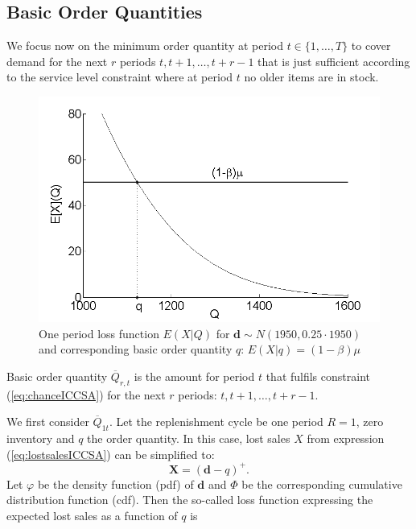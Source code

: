 \subsection{Basic Order Quantities}
\label{sec:safe}
We focus now on the minimum order quantity at period $t\in \{1,\ldots,T\}$  to cover demand for the next $r$ periods $t, t+1,\ldots, t+r-1$ that is just sufficient according to the service level constraint where at period $t$ no older items are in stock.
\begin{figure}[h]
\centering
\includegraphics[scale=0.4]{iccsa2015/figures/lossfunFig.png}
\caption{One period loss function $E(X|Q)$ for $\boldsymbol d \sim N(1950,0.25\cdot1950)$ and corresponding basic order quantity $q$: $E(X|q)=(1-\beta)\mu$}
\label{fig:lossfunFig}
\end{figure}
\begin{defn}
Basic order quantity $\overline Q_{r,t}$ is the amount for period $t$ that fulfils constraint (\ref{eq:chanceICCSA}) for the next $r$ periods: $t,t+1,\ldots,t+r-1$.
\end{defn}
We first consider $\overline Q_{1t}$. Let the replenishment cycle be one period $R=1$, zero inventory and $q$ the order quantity. In this case, lost sales $X$ from expression (\ref{eq:lostsalesICCSA}) can be simplified to:
%
\begin{equation}
\boldsymbol{X}=\left(\boldsymbol{d}-q\right)^+ .
\end{equation}
Let $\varphi$ be the density function (pdf) of $\boldsymbol d$ and $\Phi$ be the corresponding cumulative distribution function (cdf).
%
%
Then the so-called loss function expressing the expected lost sales as a function of $q$ is
